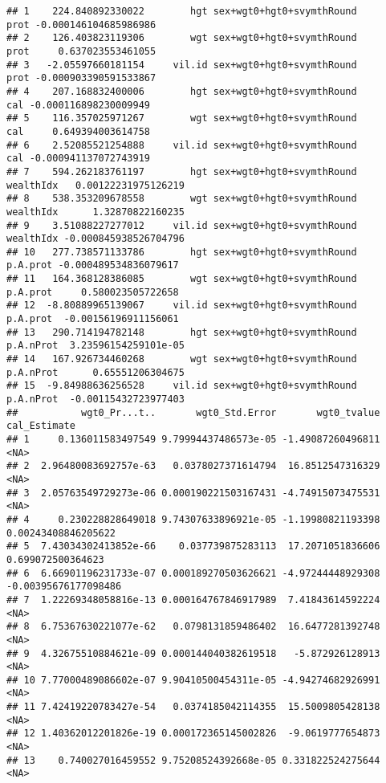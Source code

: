 \documentclass[
]{book}
\begin{document}
\begin{verbatim}
## 1    224.840892330022        hgt sex+wgt0+hgt0+svymthRound        prot -0.000146104685986986
## 2    126.403823119306        wgt sex+wgt0+hgt0+svymthRound        prot     0.637023553461055
## 3   -2.05597660181154     vil.id sex+wgt0+hgt0+svymthRound        prot -0.000903390591533867
## 4    207.168832400006        hgt sex+wgt0+hgt0+svymthRound         cal -0.000116898230009949
## 5    116.357025971267        wgt sex+wgt0+hgt0+svymthRound         cal     0.649394003614758
## 6    2.52085521254888     vil.id sex+wgt0+hgt0+svymthRound         cal -0.000941137072743919
## 7    594.262183761197        hgt sex+wgt0+hgt0+svymthRound   wealthIdx   0.00122231975126219
## 8    538.353209678558        wgt sex+wgt0+hgt0+svymthRound   wealthIdx      1.32870822160235
## 9    3.51088227277012     vil.id sex+wgt0+hgt0+svymthRound   wealthIdx -0.000845938526704796
## 10   277.738571133786        hgt sex+wgt0+hgt0+svymthRound    p.A.prot -0.000489534836079617
## 11   164.368128386085        wgt sex+wgt0+hgt0+svymthRound    p.A.prot     0.580023505722658
## 12  -8.80889965139067     vil.id sex+wgt0+hgt0+svymthRound    p.A.prot  -0.00156196911156061
## 13   290.714194782148        hgt sex+wgt0+hgt0+svymthRound   p.A.nProt  3.23596154259101e-05
## 14   167.926734460268        wgt sex+wgt0+hgt0+svymthRound   p.A.nProt      0.65551206304675
## 15  -9.84988636256528     vil.id sex+wgt0+hgt0+svymthRound   p.A.nProt  -0.00115432723977403
##           wgt0_Pr...t..       wgt0_Std.Error       wgt0_tvalue         cal_Estimate
## 1     0.136011583497549 9.79994437486573e-05 -1.49087260496811                 <NA>
## 2  2.96480083692757e-63   0.0378027371614794  16.8512547316329                 <NA>
## 3  2.05763549729273e-06 0.000190221503167431 -4.74915073475531                 <NA>
## 4     0.230228828649018 9.74307633896921e-05 -1.19980821193398  0.00243408846205622
## 5  7.43034302413852e-66    0.037739875283113  17.2071051836606    0.699072500364623
## 6  6.66901196231733e-07 0.000189270503626621 -4.97244448929308 -0.00395676177098486
## 7  1.22269348058816e-13 0.000164767846917989  7.41843614592224                 <NA>
## 8  6.75367630221077e-62   0.0798131859486402  16.6477281392748                 <NA>
## 9  4.32675510884621e-09 0.000144040382619518   -5.872926128913                 <NA>
## 10 7.77000489086602e-07 9.90410500454311e-05 -4.94274682926991                 <NA>
## 11 7.42419220783427e-54   0.0374185042114355  15.5009805428138                 <NA>
## 12 1.40362012201826e-19 0.000172365145002826  -9.0619777654873                 <NA>
## 13    0.740027016459552 9.75208524392668e-05 0.331822524275644                 <NA>

\end{verbatim}
\end{document}
